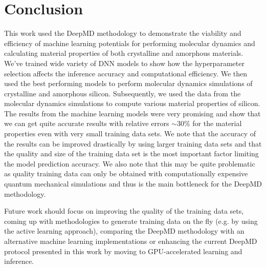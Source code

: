 \chapter{Conclusion}

This work used the DeepMD methodology to demonstrate the viability and
efficiency of machine learning potentials for performing molecular dynamics
and calculating material properties of both crystalline and amorphous
materials. We've trained wide variety of DNN models to show how the
hyperparameter selection affects the inference accuracy and computational
efficiency. We then used the best performing models to perform molecular
dynamics simulations of crystalline and amorphous silicon. Subsequently, we
used the data from the molecular dynamics simulations to compute various
material properties of silicon. The results from the machine learning models
were very promising and show that we can get quite accurate results with
relative errors $\sim 30 \%$ for the material properties even with very small
training data sets. We note that the accuracy of the results can be improved
drastically by using larger training data sets and that the quality and size
of the training data set is the most important factor limiting the model
prediction accuracy. We also note that this may be quite problematic as
quality training data can only be obtained with computationally expensive
quantum mechanical simulations and thus is the main bottleneck for the DeepMD
methodology.

Future work should focus on improving the quality of the training data sets,
coming up with methodologies to generate training data on the fly (e.g. by
using the active learning approach), comparing the DeepMD methodology with
an alternative machine learning implementations or enhancing the current
DeepMD protocol presented in this work by moving to GPU-accelerated learning
and inference. 
